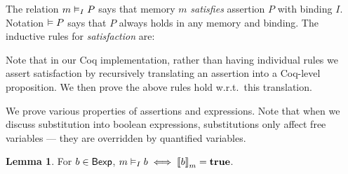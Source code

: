 \documentclass[10pt]{article}
\theoremstyle{definition}
\newtheorem{lemma}{Lemma}
\begin{document}
The relation $\AVAL m|I|-P$
says that memory $m$ \emph{satisfies} assertion $P$
with binding $I$.
Notation $\vDash P$ says that $P$ always holds
in any memory and binding.
The inductive rules for \emph{satisfaction} are:
%

Note that in our Coq implementation,
rather than having individual rules
we assert satisfaction
by recursively translating an assertion
into a Coq-level proposition.
%
We then prove the above rules hold
w.r.t.\ this translation.

We prove various properties of assertions and expressions.
Note that when we discuss substitution into boolean expressions,
substitutions only affect free variables ---
they are overridden by quantified variables.

\begin{lemma}
For $b \in \mathsf{Bexp}$,
$\AVALmi b \iff \Eval(b,m) = \True$.
\end{lemma}
\end{document}
